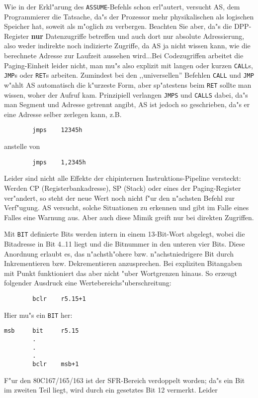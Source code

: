 \documentclass[12pt,a4paper,twoside]{report}
\newcommand{\bb}[1]{{\bf #1}}
\newcommand{\tty}[1]{{\tt #1}}
\begin{document}
{Wie in der Erkl"arung des \tty{ASSUME}-Befehls schon erl"autert, versucht
AS, dem Programmierer die Tatsache, da"s der Prozessor mehr physikalischen
als logischen Speicher hat, soweit als m"oglich zu verbergen.  Beachten
Sie aber, da"s die DPP-Register \bb{nur} Datenzugriffe betreffen und auch dort
nur absolute Adressierung, also weder indirekte noch indizierte Zugriffe,
da AS ja nicht wissen kann, wie die berechnete Adresse zur Laufzeit
aussehen wird...Bei Codezugriffen arbeitet die Paging-Einheit leider nicht,
man mu"s also explizit mit langen oder kurzen \tty{CALL}s, \tty{JMP}s oder
\tty{RET}s arbeiten.  Zumindest bei den ,,universellen'' Befehlen \tty{CALL}
und \tty{JMP} w"ahlt AS automatisch die k"urzeste Form, aber sp"atestens
beim \tty{RET} sollte man wissen, woher der Aufruf kam.  Prinzipiell
verlangen \tty{JMPS} und \tty{CALLS} dabei, da"s man Segment und Adresse
getrennt angibt, AS ist jedoch so geschrieben, da"s er eine Adresse selber
zerlegen kann, z.B.
\begin{verbatim}
        jmps    12345h
\end{verbatim}
anstelle von
\begin{verbatim}
        jmps    1,2345h
\end{verbatim}
Leider sind nicht alle Effekte der chipinternen Instruktions-Pipeline
versteckt: Werden CP (Registerbankadresse), SP (Stack) oder eines der
Paging-Register ver"andert, so steht der neue Wert noch nicht f"ur den
n"achsten Befehl zur Verf"ugung.  AS versucht, solche Situationen zu
erkennen und gibt im Falle eines Falles eine Warnung aus.  Aber auch
diese Mimik greift nur bei direkten Zugriffen.
\par
Mit \tty{BIT} definierte Bits werden intern in einem 13-Bit-Wort abgelegt,
wobei die Bitadresse in Bit 4..11 liegt und die Bitnummer in den unteren
vier Bits.  Diese Anordnung erlaubt es, das n"achsth"ohere bzw.
n"achstniedrigere Bit durch Inkrementieren bzw. Dekrementieren anzusprechen.
Bei expliziten Bitangaben mit Punkt funktioniert das aber nicht "uber
Wortgrenzen hinaus.  So erzeugt folgender Ausdruck eine
Wertebereichs"uberschreitung:
\begin{verbatim}
        bclr    r5.15+1
\end{verbatim}
Hier mu"s ein \tty{BIT} her:
\begin{verbatim}
msb     bit     r5.15
        .
        .
        .
        bclr    msb+1
\end{verbatim}
F"ur den 80C167/165/163 ist der SFR-Bereich verdoppelt worden; da"s ein Bit im
zweiten Teil liegt, wird durch ein gesetztes Bit 12 vermerkt.  Leider
}
\end{document}

